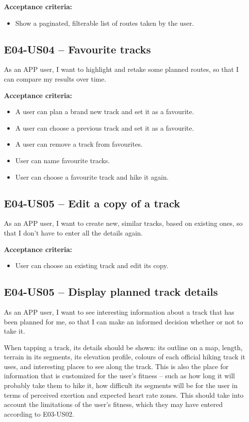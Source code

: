 \textbf{Acceptance criteria:}
\begin{itemize}
    \item Show a paginated, filterable list of routes taken by the user.
\end{itemize}

\subsection*{E04-US04 -- Favourite tracks}
As an APP user, I want to highlight and retake some planned routes, so that I can compare my results over time.

\textbf{Acceptance criteria:}
\begin{itemize}
    \item A user can plan a brand new track and set it as a favourite.
    \item A user can choose a previous track and set it as a favourite.
    \item A user can remove a track from favourites.
    \item User can name favourite tracks.
    \item User can choose a favourite track and hike it again.
\end{itemize}

\subsection*{E04-US05 -- Edit a copy of a track}
As an APP user, I want to create new, similar tracks, based on existing ones, so that I don't have to enter all the details again.

\textbf{Acceptance criteria:}
\begin{itemize}
    \item User can choose an existing track and edit its copy.
\end{itemize}

\subsection*{E04-US05 -- Display planned track details}
As an APP user, I want to see interesting information about a track that has been planned for me, so that I can make an informed decision whether or not to take it.

When tapping a track, its details should be shown: its outline on a map, length, terrain in its segments, its elevation profile, colours of each official hiking track it uses, and interesting places to see along the track.
This is also the place for information that is customized for the user's fitness -- such as how long it will probably take them to hike it, how difficult its segments will be for the user in terms of perceived exertion and expected heart rate zones.
This should take into account the limitations of the user's fitness, which they may have entered according to E03-US02.

